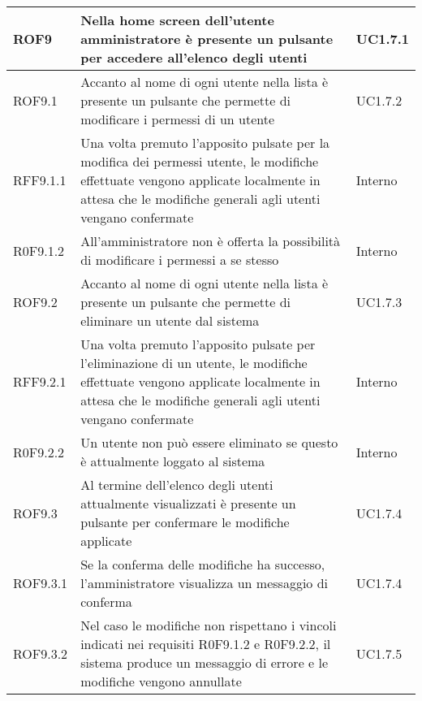 \begin{center}
\begin{longtable}{| p{2.5cm} | p{8cm} | p{2cm} |}
		ROF9  &  Nella home screen dell'utente amministratore è presente un pulsante per accedere all'elenco degli utenti  &  UC1.7.1 \\
		\hline
		ROF9.1  &  Accanto al nome di ogni utente nella lista è presente un pulsante che permette di modificare i permessi di un utente  &  UC1.7.2 \\
		\hline
		RFF9.1.1  &  Una volta premuto l'apposito pulsate per la modifica dei permessi utente, le modifiche effettuate vengono applicate localmente in attesa che le modifiche generali agli utenti vengano confermate  &  Interno \\
		\hline
		R0F9.1.2  &  All'amministratore non è offerta la possibilità di modificare i permessi a se stesso  &  Interno \\
		\hline
		ROF9.2  &  Accanto al nome di ogni utente nella lista è presente un pulsante che permette di eliminare un utente dal sistema  &  UC1.7.3 \\
		\hline
		RFF9.2.1  &  Una volta premuto l'apposito pulsate per l'eliminazione di un utente, le modifiche effettuate vengono applicate localmente in attesa che le modifiche generali agli utenti vengano confermate  &  Interno \\
		\hline
		R0F9.2.2  &  Un utente non può essere eliminato se questo è attualmente loggato al sistema  &  Interno \\
		\hline
		ROF9.3  &  Al termine dell'elenco degli utenti attualmente visualizzati è presente un pulsante per confermare le modifiche applicate  &  UC1.7.4 \\
		\hline
		ROF9.3.1  &  Se la conferma delle modifiche ha successo, l'amministratore visualizza un messaggio di conferma  &  UC1.7.4 \\
		\hline
		ROF9.3.2  &  Nel caso le modifiche non rispettano i vincoli indicati nei requisiti R0F9.1.2 e R0F9.2.2, il sistema produce un messaggio di errore e le modifiche vengono annullate  &  UC1.7.5 \\
		\hline



\end{longtable}
\end{center}
